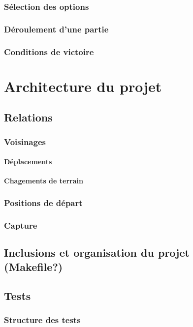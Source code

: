 \documentclass[10pt,a4paper,oneside]{report}
\begin{document}
\subsection{Sélection des options}
\subsection{Déroulement d'une partie}
\subsection{Conditions de victoire}

\chapter{Architecture du projet}
\section{Relations}
\subsection{Voisinages}
\subsubsection{Déplacements}
\subsubsection{Chagements de terrain}
\subsection{Positions de départ}
\subsection{Capture}

\section{Inclusions et organisation du projet (Makefile?)}

\section{Tests}
\subsection{Structure des tests}
\end{document}
